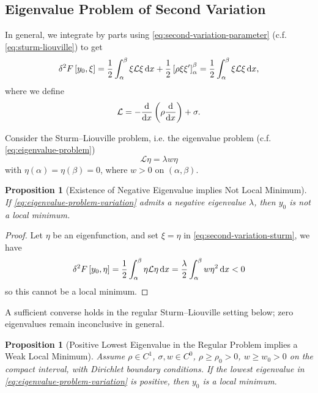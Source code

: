 \documentclass[11pt]{article}
\numberwithin{equation}{section}
\newtheorem{proposition}[theorem]{Proposition}
\theoremstyle{definition}
\theoremstyle{remark}
\newcommand{\pqty}[1]{\left(#1\right)}
\newcommand{\bqty}[1]{\left[#1\right]}
\newcommand{\oointv}[2]{(#1,#2)}
\begin{document}
\subsection{Eigenvalue Problem of Second Variation}

In general, we integrate by parts using \autoref{eq:second-variation-parameter} (c.f. \autoref{eq:sturm-liouville}) to get
\begin{equation}
    \label{eq:second-variation-sturm}%
    \var[2]{F\bqty{y_0, \xi}} = \frac{1}{2} \int_{\alpha}^{\beta} \xi \mathcal{L} \xi \dd{x} + \frac{1}{2} \bqty{\rho \xi \xi'}_{\alpha}^{\beta} = \frac{1}{2} \int_{\alpha}^{\beta} \xi \mathcal{L} \xi \dd{x},
\end{equation}
where we define
\[
    \mathcal{L} = - \dv{x}\pqty{\rho \dv{x}} + \sigma.
\]

Consider the Sturm--Liouville problem, i.e. the eigenvalue problem (c.f. \autoref{eq:eigenvalue-problem})
\begin{equation}
    \label{eq:eigenvalue-problem-variation}%
    \mathcal{L} \eta = \lambda w \eta
\end{equation}
with \(\eta\pqty{\alpha} = \eta\pqty{\beta} = 0\), where \(w > 0\) on \(\oointv{\alpha}{\beta}\).

\begin{proposition}[Existence of Negative Eigenvalue implies Not Local Minimum]\label{variation-unit-0099}
    If \autoref{eq:eigenvalue-problem-variation} admits a negative eigenvalue \(\lambda\), then \(y_0\) is not a local minimum.
\end{proposition}

\begin{proof}
    Let \(\eta\) be an eigenfunction, and set \(\xi = \eta\) in \autoref{eq:second-variation-sturm}, we have
    \[
        \var[2]{F\bqty{y_0, \eta}} = \frac{1}{2} \int_{\alpha}^{\beta} \eta \mathcal{L} \eta \dd{x} = \frac{\lambda}{2} \int_{\alpha}^{\beta} w \eta^2 \dd{x} < 0
    \]
    so this cannot be a local minimum.
\end{proof}

A sufficient converse holds in the regular Sturm--Liouville setting below; zero eigenvalues remain inconclusive in general.

\begin{proposition}[Positive Lowest Eigenvalue in the Regular Problem implies a Weak Local Minimum]\label{variation-unit-0100}
    Assume \(\rho\in C^1\), \(\sigma,w\in C^0\), \(\rho\ge\rho_0>0\), \(w\ge w_0>0\) on the compact interval, with Dirichlet boundary conditions. If the lowest eigenvalue in \autoref{eq:eigenvalue-problem-variation} is positive, then \(y_0\) is a local minimum.
\end{proposition}
\end{document}
